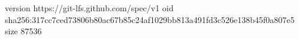 version https://git-lfs.github.com/spec/v1
oid sha256:317cc7ced73806b80ac67b85c24af1029bb813a491fd3c526e138b45f0a807e5
size 87536
